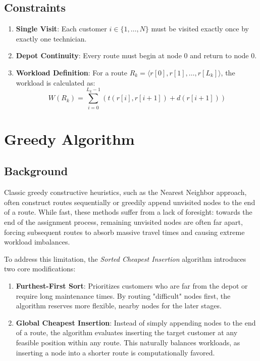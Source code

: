 \documentclass[11pt]{article}
\begin{document}
\subsection{Constraints}
\begin{enumerate}
    \item \textbf{Single Visit}: Each customer $i \in \{1, \dots, N\}$ must be visited exactly once by exactly one technician.
    \item \textbf{Depot Continuity}: Every route must begin at node $0$ and return to node $0$.
    \item \textbf{Workload Definition}: For a route $R_k = \langle r[0], r[1], \dots, r[L_k] \rangle$, the workload is calculated as:
    \begin{equation}
        W(R_k) = \sum_{i=0}^{L_k - 1} \left( t(r[i], r[i+1]) + d(r[i+1]) \right)
    \end{equation}
\end{enumerate}

\section{Greedy Algorithm}

\subsection{Background}
Classic greedy constructive heuristics, such as the Nearest Neighbor approach, often construct routes sequentially or greedily append unvisited nodes to the end of a route. While fast, these methods suffer from a lack of foresight: towards the end of the assignment process, remaining unvisited nodes are often far apart, forcing subsequent routes to absorb massive travel times and causing extreme workload imbalances.

To address this limitation, the \textit{Sorted Cheapest Insertion} algorithm introduces two core modifications:
\begin{enumerate}
    \item \textbf{Furthest-First Sort}: Prioritizes customers who are far from the depot or require long maintenance times. By routing "difficult" nodes first, the algorithm reserves more flexible, nearby nodes for the later stages.
    \item \textbf{Global Cheapest Insertion}: Instead of simply appending nodes to the end of a route, the algorithm evaluates inserting the target customer at any feasible position within any route. This naturally balances workloads, as inserting a node into a shorter route is computationally favored.
\end{enumerate}
\end{document}
